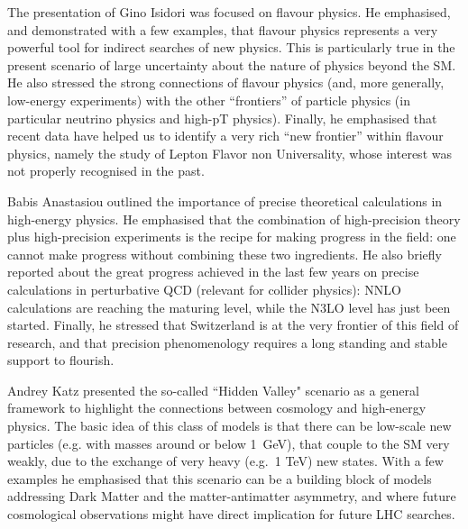 \noindent  The presentation of Gino Isidori was focused on flavour physics. He emphasised, and 
demonstrated with a few examples, that flavour physics represents
a very powerful tool for indirect searches of new physics. This is particularly true in the 
present scenario of large uncertainty about the nature of physics beyond the SM. 
He also stressed the strong connections of flavour physics (and, more generally, low-energy experiments) 
with the other ``frontiers'' of particle physics (in particular neutrino physics and high-pT physics).
Finally, he emphasised that recent data have helped us to identify a very rich ``new frontier''
within flavour physics, namely the study of Lepton Flavor non Universality, whose interest 
was not properly recognised in the past. 
\medskip

\noindent Babis Anastasiou outlined the importance of precise theoretical calculations in high-energy 
physics. He emphasised that the combination of high-precision theory plus 
high-precision experiments is the recipe for making progress in the field: 
one cannot make progress without combining these two ingredients. He also briefly reported about the great progress
achieved in the last few years on precise calculations in 
perturbative QCD (relevant for collider physics): NNLO calculations are reaching 
the maturing level, while the N3LO level has just been started. 
Finally, he stressed that Switzerland is at the very frontier of this field of research,
 and that precision phenomenology requires a long standing and stable support to flourish.
 \medskip
 
\noindent  Andrey Katz presented the so-called ``Hidden Valley"  scenario as a general
framework to highlight the connections between cosmology and high-energy physics.
 The basic idea of this class of models is that there can be low-scale new particles
  (e.g. with masses around or below 1~GeV), that couple to the SM very weakly, 
  due to the exchange of very heavy (e.g.~1 TeV) new states. With a few examples he 
  emphasised that this scenario can be a building block of models addressing 
Dark Matter and the matter-antimatter asymmetry, and where  
future cosmological observations might have direct implication for future LHC searches.
